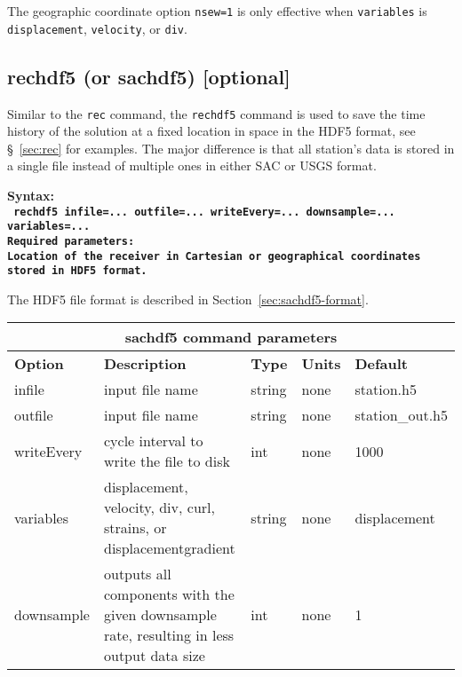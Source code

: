 \documentclass[11pt]{report}
\begin{document}
The geographic coordinate option {\tt nsew=1} is only effective when {\tt variables} is
{\tt displacement}, {\tt velocity}, or {\tt div}.



\subsection{rechdf5 (or sachdf5) [optional]}
Similar to the \verb+rec+ command, the \verb+rechdf5+ command is used to save the time history of the solution at a fixed location in
space in the HDF5 format, see \S~\ref{sec:rec} for examples. The major difference is that all station's data is stored in a single
file instead of multiple ones in either SAC or USGS format.
\begin{flushleft}
\bf
Syntax:\\
\tt
rechdf5 infile=... outfile=... writeEvery=... downsample=... variables=...
\\
\bf Required parameters:\\
\rm Location of the receiver in Cartesian or geographical coordinates stored in HDF5 format.
\end{flushleft}
%
The HDF5 file format is described in Section~\ref{sec:sachdf5-format}.
%

\begin{center}
\begin{tabular}{|l|p{8cm}|l|l|l|} \hline
\multicolumn{5}{|c|}{\bf sachdf5 command parameters}\\ \hline
\bf{Option} & \bf{Description} & \bf{Type} & \bf{Units} & \bf{Default} \\ \hline \hline
infile & input file name  & string & none & station.h5 \\ \hline
outfile & input file name  & string & none & station\_out.h5 \\ \hline
writeEvery & cycle interval to write the file to disk & int & none & 1000 \\ \hline
%
\hline
variables & displacement, velocity, div, curl, strains, or displacementgradient & string & none & displacement \\ \hline
downsample & outputs all components with the given downsample rate, resulting in less output data size & int & none & 1\\ \hline
\end{tabular}
\end{center}
\end{document}
